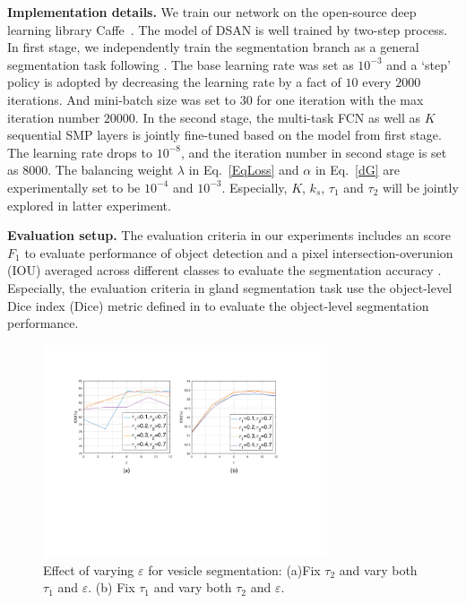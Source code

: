 \noindent\textbf{Implementation details.}
We train our network on the open-source deep learning library Caffe~\cite{Jia2014}.
The model of DSAN is well trained by two-step process.
In first stage, we independently train the segmentation branch as a general segmentation task following \cite{Chen2014a}.
The base learning rate was set as $10^{-3}$ and a `step' policy is adopted by decreasing the learning rate by a fact of $10$ every $2000$ iterations.
And mini-batch size was set to $30$ for one iteration with the max iteration number $20000$.
In the second stage, the multi-task FCN as well as $K$ sequential SMP layers is jointly fine-tuned based on the model from first stage.
The learning rate drops to $10^{-8}$, and the iteration number in second stage is set as $8000$.
The balancing weight $\lambda$ in Eq.~\ref{EqLoss} and $\alpha$ in Eq.~\ref{dG} are experimentally set to be $10^{-4}$ and $10^{-3}$.
Especially, $K$, $k_s$, $\tau_1$ and $\tau_2$ will be jointly explored in latter experiment.

\noindent\textbf{Evaluation setup.}
%
The evaluation criteria in our experiments includes an score $F_1$ \cite{Chen2016a} to evaluate performance of object detection and a pixel intersection-overunion (IOU) averaged across different classes \cite{Chen2014a} to evaluate  the segmentation accuracy .
Especially, the evaluation criteria in gland segmentation task use the object-level Dice index (Dice) metric defined in \cite{Chen2016a} to evaluate the object-level segmentation performance.

\begin{figure}
    \begin{center}
        \includegraphics[width=3.3in]{figures/FigVar.pdf}
    \end{center}
    \caption{Effect of varying $\varepsilon$ for vesicle segmentation: (a)Fix $\tau_2$ and vary both $\tau_1$ and $\varepsilon$. (b) Fix $\tau_1$ and vary both $\tau_2$ and $\varepsilon$.}
    \label{FigVar}
\end{figure}


